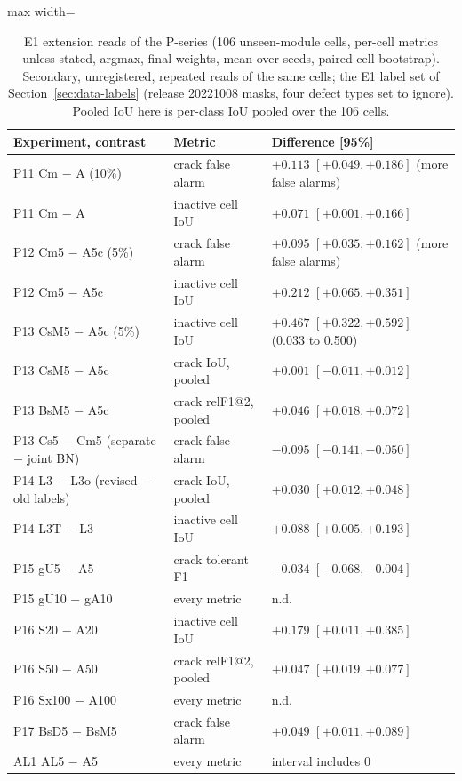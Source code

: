 \begin{table}[htbp]
\centering\small
\caption{E1 extension reads of the P-series (106 unseen-module cells, per-cell metrics unless stated, argmax, final weights,
mean over seeds, paired cell bootstrap). Secondary, unregistered, repeated reads of the same cells; the E1 label set of
Section~\ref{sec:data-labels} (release 20221008 masks, four defect types set to ignore). Pooled IoU here is per-class IoU pooled over the 106 cells.}
\label{tab:pseries-e1}
\begin{adjustbox}{max width=\linewidth}
\begin{tabular}{@{}lll@{}}
\toprule
Experiment, contrast & Metric & Difference [95\%] \\
\midrule
P11 Cm $-$ A (10\%) & crack false alarm & $+0.113$ $[+0.049, +0.186]$ (more false alarms) \\
P11 Cm $-$ A & inactive cell IoU & $+0.071$ $[+0.001, +0.166]$ \\
P12 Cm5 $-$ A5c (5\%) & crack false alarm & $+0.095$ $[+0.035, +0.162]$ (more false alarms) \\
P12 Cm5 $-$ A5c & inactive cell IoU & $+0.212$ $[+0.065, +0.351]$ \\
P13 CsM5 $-$ A5c (5\%) & inactive cell IoU & $+0.467$ $[+0.322, +0.592]$ (0.033 to 0.500) \\
P13 CsM5 $-$ A5c & crack IoU, pooled & $+0.001$ $[-0.011, +0.012]$ \\
P13 BsM5 $-$ A5c & crack relF1@2, pooled & $+0.046$ $[+0.018, +0.072]$ \\
P13 Cs5 $-$ Cm5 (separate $-$ joint BN) & crack false alarm & $-0.095$ $[-0.141, -0.050]$ \\
P14 L3 $-$ L3o (revised $-$ old labels) & crack IoU, pooled & $+0.030$ $[+0.012, +0.048]$ \\
P14 L3T $-$ L3 & inactive cell IoU & $+0.088$ $[+0.005, +0.193]$ \\
P15 gU5 $-$ A5 & crack tolerant F1 & $-0.034$ $[-0.068, -0.004]$ \\
P15 gU10 $-$ gA10 & every metric & n.d. \\
P16 S20 $-$ A20 & inactive cell IoU & $+0.179$ $[+0.011, +0.385]$ \\
P16 S50 $-$ A50 & crack relF1@2, pooled & $+0.047$ $[+0.019, +0.077]$ \\
P16 Sx100 $-$ A100 & every metric & n.d. \\
P17 BsD5 $-$ BsM5 & crack false alarm & $+0.049$ $[+0.011, +0.089]$ \\
AL1 AL5 $-$ A5 & every metric & interval includes 0 \\
\bottomrule
\end{tabular}
\end{adjustbox}
\end{table}


